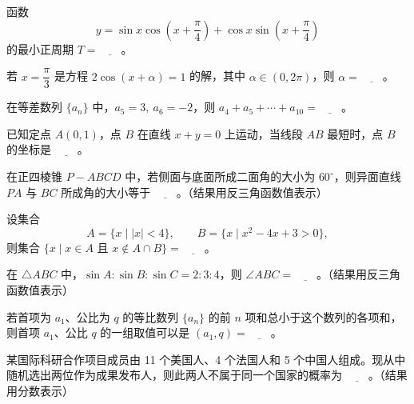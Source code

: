 \begin{question}
函数
\nopagebreak[4]
\[
   y=\sin x\cos\left(x+\frac{\pi}{4}\right)+\cos x\sin\left(x+\frac{\pi}{4}\right)
\]
   的最小正周期 \(T=\underline{\qquad}\)。

\end{question}
\begin{question}
若 \(x=\dfrac{\pi}{3}\) 是方程 \(2\cos(x+\alpha)=1\) 的解，其中 \(\alpha\in(0,2\pi)\)，则 \(\alpha=\underline{\qquad}\)。

\end{question}
\begin{question}
在等差数列 \(\{a_n\}\) 中，\(a_5=3,\ a_6=-2\)，则 \(a_4+a_5+\cdots+a_{10}=\underline{\qquad}\)。

\end{question}
\begin{question}
已知定点 \(A(0,1)\)，点 \(B\) 在直线 \(x+y=0\) 上运动，当线段 \(AB\) 最短时，点 \(B\) 的坐标是 \(\underline{\qquad}\)。

\end{question}
\begin{question}
在正四棱锥 \(P-ABCD\) 中，若侧面与底面所成二面角的大小为 \(60^\circ\)，则异面直线 \(PA\) 与 \(BC\) 所成角的大小等于 \(\underline{\qquad}\)。（结果用反三角函数值表示）

\end{question}
\begin{question}
设集合
\nopagebreak[4]
\[
   A=\{x\mid |x|<4\},\qquad B=\{x\mid x^2-4x+3>0\},
\]
   则集合 \(\{x\mid x\in A\text{ 且 }x\notin A\cap B\}=\underline{\qquad}\)。

\end{question}
\begin{question}
在 \(\triangle ABC\) 中，\(\sin A:\sin B:\sin C=2:3:4\)，则 \(\angle ABC=\underline{\qquad}\)。（结果用反三角函数值表示）

\end{question}
\begin{question}
若首项为 \(a_1\)、公比为 \(q\) 的等比数列 \(\{a_n\}\) 的前 \(n\) 项和总小于这个数列的各项和，则首项 \(a_1\)、公比 \(q\) 的一组取值可以是 \((a_1,q)=\underline{\qquad}\)。

\end{question}
\begin{question}
某国际科研合作项目成员由 11 个美国人、4 个法国人和 5 个中国人组成。现从中随机选出两位作为成果发布人，则此两人不属于同一个国家的概率为 \(\underline{\qquad}\)。（结果用分数表示）

\end{question}
